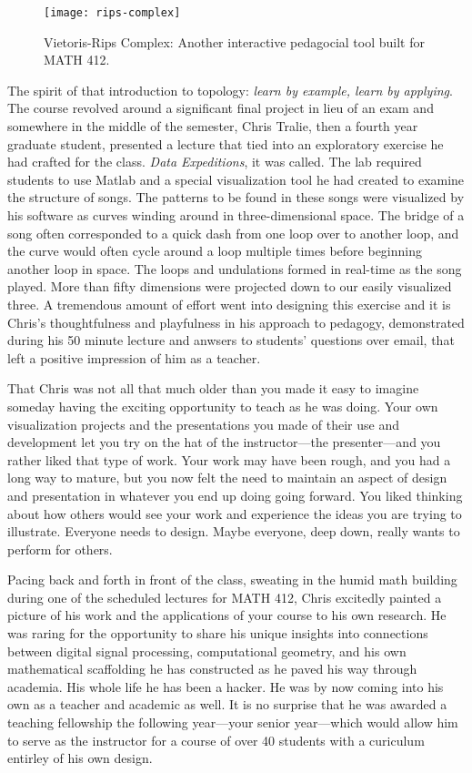 \documentclass[../main.tex]{subfiles}
\begin{document}
\begin{figure}[h]
	\centering
	\texttt{[image: rips-complex]}
	\caption*{Vietoris-Rips Complex: Another interactive pedagocial tool built for MATH 412.}
\end{figure}

The spirit of that introduction to topology: \textit{learn by example, learn by applying}. The course revolved around a significant final project in lieu of an exam and somewhere in the middle of the semester, Chris Tralie, then a fourth year graduate student, presented a lecture that tied into an exploratory exercise he had crafted for the class. \textit{Data Expeditions}, it was called. The lab required students to use Matlab and a special visualization tool he had created to examine the structure of songs. The patterns to be found in these songs were visualized by his software as curves winding around in three-dimensional space. The bridge of a song often corresponded to a quick dash from one loop over to another loop, and the curve would often cycle around a loop multiple times before beginning another loop in space. The loops and undulations formed in real-time as the song played. More than fifty dimensions were projected down to our easily visualized three. A tremendous amount of effort went into designing this exercise and it is Chris's thoughtfulness and playfulness in his approach to pedagogy, demonstrated during his 50 minute lecture and anwsers to students' questions over email, that left a positive impression of him as a teacher.

That Chris was not all that much older than you made it easy to imagine someday having the exciting opportunity to teach as he was doing. Your own visualization projects and the presentations you made of their use and development let you try on the hat of the instructor---the presenter---and you rather liked that type of work. Your work may have been rough, and you had a long way to mature, but you now felt the need to maintain an aspect of design and presentation in whatever you end up doing going forward. You liked thinking about how others would see your work and experience the ideas you are trying to illustrate. Everyone needs to design. Maybe everyone, deep down, really wants to perform for others.

 Pacing back and forth in front of the class, sweating in the humid math building during one of the scheduled lectures for MATH 412, Chris excitedly painted a picture of his work and the applications of your course to his own research. He was raring for the opportunity to share his unique insights into connections between digital signal processing, computational geometry, and his own mathematical scaffolding he has constructed as he paved his way through academia. His whole life he has been a hacker. He was by now coming into his own as a teacher and academic as well. It is no surprise that he was awarded a teaching fellowship the following year---your senior year---which would allow him to serve as the instructor for a course of over 40 students with a curiculum entirley of his own design.
 
\end{document}
